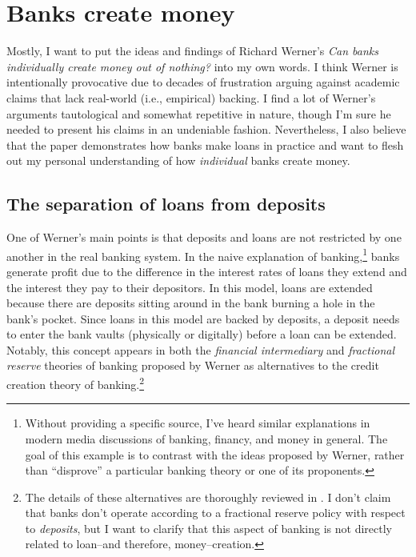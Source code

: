 \section{Banks create money}

Mostly, I want to put the ideas and findings of Richard Werner's {\it Can banks individually create money out of nothing?} \cite{Werner2014} into my own words.  I think  Werner is intentionally provocative due to decades of frustration arguing against academic claims that lack real-world (i.e., empirical) backing.  I find a lot of Werner's arguments tautological and somewhat repetitive in nature, though I'm sure he needed to present his claims in an undeniable fashion.  Nevertheless, I also believe that the paper demonstrates how banks make loans in practice and want to flesh out my personal understanding of how {\it individual} banks create money.


\subsection{The separation of loans from deposits}

One of Werner's main points is that deposits and loans are not restricted by one another in the real banking system.  In the naive explanation of banking,\footnote{Without providing a specific source, I've heard similar explanations in modern media discussions of banking, financy, and money in general.  The goal of this example is to contrast with the ideas proposed by Werner, rather than ``disprove'' a particular banking theory or one of its proponents.} banks generate profit due to the difference in the interest rates of loans they extend and the interest they pay to their depositors.  In this model, loans are extended because there are deposits sitting around in the bank burning a hole in the bank's pocket.  Since loans in this model are backed by deposits, a deposit needs to enter the bank vaults (physically or digitally) before a loan can be extended.  Notably, this concept appears in both the {\it financial intermediary} and {\it fractional reserve} theories of banking proposed by Werner as alternatives to the credit creation theory of banking.\footnote{The details of these alternatives are thoroughly reviewed in \cite{Werner2014}.  I don't claim that banks don't operate according to a fractional reserve policy with respect to {\it deposits}, but I want to clarify that this aspect of banking is not directly related to loan--and therefore, money--creation.}  


